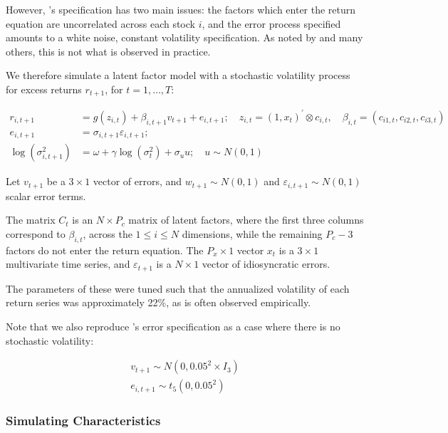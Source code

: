 \documentclass{article}
\begin{document}
However, \cite{gu_empirical_2018}'s specification has two main issues: the factors which enter the return equation are uncorrelated across each stock $i$, and the error process specified amounts to a white noise, constant volatility specification. As noted by \cite{harvey__2016} and many others, this is not what is observed in practice. 

We therefore simulate a latent factor model with a stochastic volatility process for excess returns  $r_{t+1}$, for $t=1,\dots,T$:

\begin{align}
r_{i, t+1} &= 
g\left(z_{i, t}\right) + \beta_{i,t+1}v_{t+1} + e_{i, t+1}; 
\quad z_{i, t}=\left(1, x_{t}\right)^{\prime} \otimes c_{i, t}, 
\quad \beta_{i, t}=\left(c_{i 1, t}, c_{i 2, t}, c_{i 3, t}\right) \\ 
e_{i, t+1} &= 
\sigma_{i, t+1} \varepsilon_{i, t+1}; \\
\operatorname{log} (\sigma^2_{i,t+1}) &= 
\omega + \gamma \operatorname{log} (\sigma^2_{t}) + \sigma_{u}u; 
\quad u \sim N(0, 1)
\end{align}

Let $v_{t+1}$ be a $3\times 1$ vector of errors, and $w_{t+1} \sim N(0, 1)$ and $\varepsilon_{i,t+1} \sim N(0, 1)$ scalar error terms. 

The matrix $C_t$ is an $N\times P_c$ matrix of latent factors, where the first three columns correspond to $\beta_{i,t}$, across the $1\leq i\leq N$ dimensions, while the remaining $P_c-3$ factors do not enter the return equation. The $P_x\times1$ vector $x_t$ is a $3 \times 1$ multivariate time series, and $\varepsilon_{t+1}$ is a $N\times 1$ vector of idiosyncratic errors. 

The parameters of these were tuned such that the annualized volatility of each return series was approximately 22\%, as is often observed empirically.

Note that we also reproduce \cite{gu_empirical_2018}'s error specification as a case where there is no stochastic volatility:

\begin{align}
v_{t+1} \sim N(0, 0.05^2 \times I_3) \\
e_{i, t+1} \sim t_5(0, 0.05^2)
\end{align}

\subsubsection{Simulating Characteristics}
\end{document}
